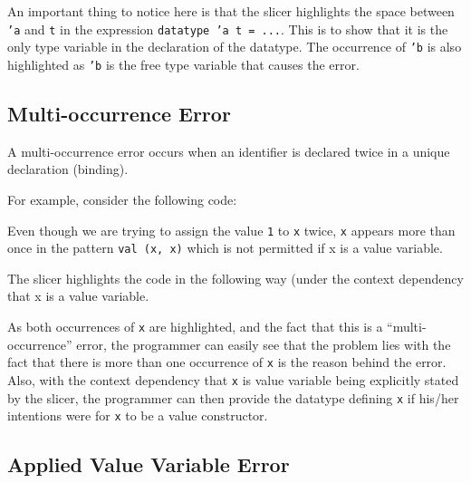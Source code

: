 \documentclass{report}
\begin{document}
\begin{itemize}

An important thing to notice here is that the slicer highlights the
space between \texttt{'a} and \texttt{t} in the
expression \texttt{datatype 'a t = ...}. This is to show that
it is the only type variable in the declaration of the datatype. The
occurrence of \texttt{'b} is also highlighted as
\texttt{'b} is the free
type variable that causes the error.

\vspace{1in}


\subsection{Multi-occurrence Error}

\subitem A multi-occurrence error occurs when an identifier is
declared twice in a unique declaration (binding).

For example, consider the following code:


Even though we are trying to assign the value \texttt{1} to
\texttt{x} twice, \texttt{x} appears more than once in
the pattern \texttt{val (x, x)} which is not permitted if x is
a value variable.

The slicer highlights the code in the following way (under the
context dependency that x is a value variable.


As both occurrences of \texttt{x} are highlighted, and the fact
that this is a ``multi-occurrence'' error, the programmer can easily
see that the problem lies with the fact that there is more than one
occurrence of \texttt{x} is the reason behind the error. Also,
with the context dependency that \texttt{x} is value variable being
explicitly stated by the slicer, the programmer can then provide the
datatype defining \texttt{x} if his/her intentions were for
\texttt{x} to be a value constructor.

\newpage


\subsection{Applied Value Variable Error}


\end{itemize}
\end{document}
